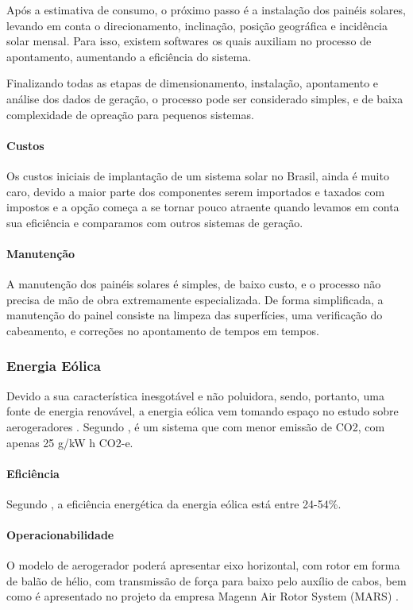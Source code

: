   Após a estimativa de consumo, o próximo passo é a instalação dos painéis solares, levando em conta o direcionamento, inclinação, posição geográfica e incidência solar mensal. Para isso, existem softwares os quais auxiliam no processo de apontamento, aumentando a eficiência do sistema.
    
  Finalizando todas as etapas de dimensionamento, instalação, apontamento e análise dos dados de geração, o processo pode ser considerado simples, e de baixa complexidade de opreação para pequenos sistemas.
    
    \paragraph{Custos}
  Os custos iniciais de implantação de um sistema solar no Brasil, ainda é muito caro, devido a maior parte dos componentes serem importados e taxados com impostos e a opção começa a se tornar pouco atraente quando levamos em conta sua eficiência e comparamos com outros sistemas de geração.
  
   \paragraph{Manutenção}
  A manutenção dos painéis solares é simples, de baixo custo, e o processo não precisa de mão de obra extremamente especializada. De forma simplificada, a manutenção do painel consiste na limpeza das superfícies, uma verificação do cabeamento, e correções no apontamento de tempos em tempos.
  
\subsubsection{Energia Eólica}
  Devido a sua característica inesgotável e não poluidora, sendo, portanto, uma fonte de energia renovável, a energia eólica vem tomando espaço no estudo sobre aerogeradores \cite{rocha2010}. Segundo \cite{Evans20091082}, é um sistema que com menor emissão de CO2, com apenas 25 g/kW h CO2-e.
  
  \paragraph{Eficiência}
  Segundo \cite{Evans20091082}, a eficiência energética da energia eólica está entre 24-54\%.
  
  \paragraph{Operacionabilidade}
  O modelo de aerogerador poderá apresentar eixo horizontal, com rotor em forma de balão de hélio, com transmissão de força para baixo pelo auxílio de cabos, bem como é apresentado no projeto da empresa Magenn Air Rotor System (MARS) \cite{texeira2012}.
  
